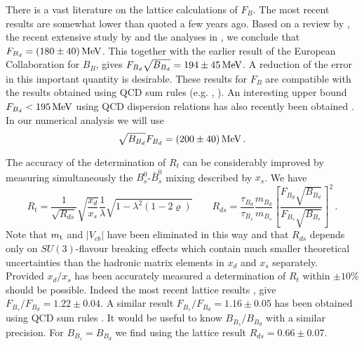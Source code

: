 There is a vast literature on the lattice calculations of $F_B$. The
most recent results are somewhat lower than quoted a few years ago.
Based on a review by \cite{sachrajda:94}, the recent extensive study by
\cite{duncanetal:94} and the analyses in \cite{bernardetal:94},
\cite{drapermcneile:94} we conclude that $F_{B_d}=(180\pm40)\, {\rm MeV}$. This
together with the earlier result of the European Collaboration
\cite{abadaetal:92} for $B_B$, gives $F_{B_d}\sqrt{B_{B_d}}=194\pm
45\, {\rm MeV}$. A reduction of the error in this important quantity is
desirable. These results for $F_B$ are compatible with the results
obtained using QCD sum rules (e.g. \cite{baganetal:92},
\cite{neubert:92}). An interesting upper bound $F_{B_d}<195\, {\rm MeV}$ using
QCD dispersion relations has also recently been obtained
\cite{boydetal:94}. In our numerical analysis we will use
\begin{equation}
\sqrt{B_{B_d}} F_{B_d} = (200 \pm 40)\, {\rm MeV} \, .
\label{eq:Fbnum}
\end{equation}

The accuracy of the determination of $R_t$ can be considerably improved
by measuring simultaneously the $B_s^0$-$\bar B_s^0$ mixing described by
$x_s$. We have
\begin{equation}
R_t = \frac{1}{\sqrt{R_{ds}}} \sqrt{\frac{x_d}{x_s}} \frac{1}{\lambda}
\sqrt{1 - \lambda^2 (1 - 2 \varrho)}
\qquad
R_{ds} = \frac{\tau_{B_d}}{\tau_{B_s}} \frac{m_{B_d}}{m_{B_s}}
\left[ \frac{F_{B_d} \sqrt{B_{B_d}}}{F_{B_s} \sqrt{B_{B_s}}} \right]^2 \, .
\label{eq:Rt}
\end{equation}
Note that $m_{\rm t}$ and $|V_{cb}|$ have been eliminated in this way and that
$R_{ds}$ depends only on $SU(3)$-flavour breaking effects which contain
much smaller theoretical uncertainties than the hadronic matrix elements
in $x_d$ and $x_s$ separately.
Provided $x_d/x_s$ has been accurately measured a determination of
$R_t$ within $\pm 10\%$ should be possible. Indeed the most recent
lattice results \cite{duncanetal:94}, \cite{baxteretal:94} give
$F_{B_s}/F_{B_d} = 1.22\pm0.04$. A similar result $F_{B_s}/F_{B_d} =
1.16\pm0.05$ has been obtained using QCD sum rules \cite{narison:94}.
It would be useful to know $B_{B_s}/B_{B_d}$ with a similar precision.
For $B_{B_s}=B_{B_d}$ we find using the lattice result $R_{ds} =
0.66 \pm 0.07$.

